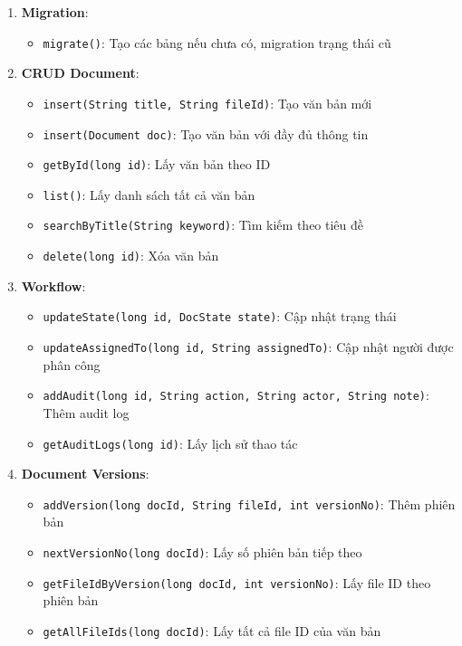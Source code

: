 \documentclass[12pt,a4paper]{article}
\begin{document}
\begin{enumerate}
    \item \textbf{Migration}:
    \begin{itemize}
        \item \texttt{migrate()}: Tạo các bảng nếu chưa có, migration trạng thái cũ
    \end{itemize}
    
    \item \textbf{CRUD Document}:
    \begin{itemize}
        \item \texttt{insert(String title, String fileId)}: Tạo văn bản mới
        \item \texttt{insert(Document doc)}: Tạo văn bản với đầy đủ thông tin
        \item \texttt{getById(long id)}: Lấy văn bản theo ID
        \item \texttt{list()}: Lấy danh sách tất cả văn bản
        \item \texttt{searchByTitle(String keyword)}: Tìm kiếm theo tiêu đề
        \item \texttt{delete(long id)}: Xóa văn bản
    \end{itemize}
    
    \item \textbf{Workflow}:
    \begin{itemize}
        \item \texttt{updateState(long id, DocState state)}: Cập nhật trạng thái
        \item \texttt{updateAssignedTo(long id, String assignedTo)}: Cập nhật người được phân công
        \item \texttt{addAudit(long id, String action, String actor, String note)}: Thêm audit log
        \item \texttt{getAuditLogs(long id)}: Lấy lịch sử thao tác
    \end{itemize}
    
    \item \textbf{Document Versions}:
    \begin{itemize}
        \item \texttt{addVersion(long docId, String fileId, int versionNo)}: Thêm phiên bản
        \item \texttt{nextVersionNo(long docId)}: Lấy số phiên bản tiếp theo
        \item \texttt{getFileIdByVersion(long docId, int versionNo)}: Lấy file ID theo phiên bản
        \item \texttt{getAllFileIds(long docId)}: Lấy tất cả file ID của văn bản
    \end{itemize}
    

\end{enumerate}
\end{document}
